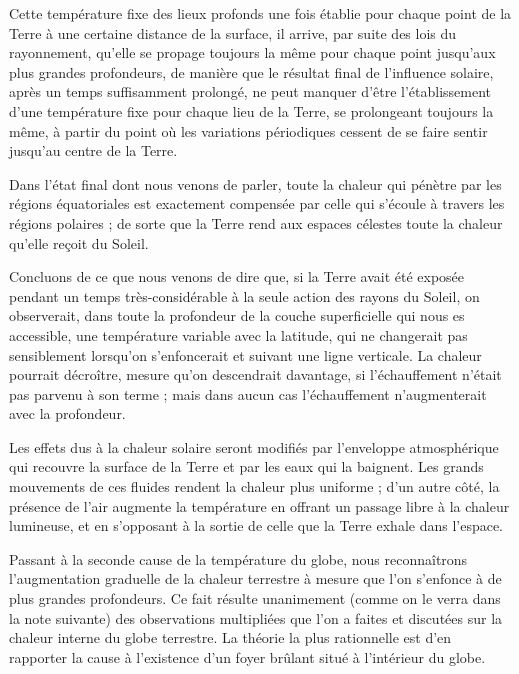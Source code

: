 \documentclass[a4paper, 11pt, oneside, landscape]{article}
\begin{document}
Cette température fixe des lieux profonds une fois établie pour chaque point de la Terre à une certaine distance de la surface, il arrive, par suite des lois du rayonnement, qu'elle se propage toujours la même pour chaque point jusqu'aux plus grandes profondeurs, de manière que le résultat final de l'influence solaire, après un temps suffisamment prolongé, ne peut manquer d'être l'établissement d'une température fixe pour chaque lieu de la Terre, se prolongeant toujours la même, à partir du point où les variations périodiques cessent de se faire sentir jusqu'au centre de la Terre.

Dans l'état final dont nous venons de parler, toute la chaleur qui pénètre par les régions équatoriales est exactement compensée par celle qui s'écoule à travers les régions polaires ; de sorte que la Terre rend aux espaces célestes toute la chaleur qu'elle reçoit du Soleil.

Concluons de ce que nous venons de dire que, si la Terre avait été exposée pendant un temps très-considérable à la seule action des rayons du Soleil, on observerait, dans toute la profondeur de la couche superficielle qui nous es accessible, une température variable avec la latitude, qui ne changerait pas sensiblement lorsqu'on s'enfoncerait et suivant une ligne verticale. La chaleur pourrait décroître, mesure qu'on descendrait davantage, si l'échauffement n'était pas parvenu à son terme ; mais dans aucun cas l'échauffement n'augmenterait avec la profondeur.

Les effets dus à la chaleur solaire seront modifiés par l'enveloppe atmosphérique qui recouvre la surface de la Terre et par les eaux qui la baignent. Les grands mouvements de ces fluides rendent la chaleur plus uniforme ; d'un autre côté, la présence de l'air augmente la température en offrant un passage libre à la chaleur lumineuse, et en s'opposant à la sortie de celle que la Terre exhale dans l'espace.

Passant à la seconde cause de la température du globe, nous reconnaîtrons l'augmentation graduelle de la chaleur terrestre à mesure que l'on s'enfonce à de plus grandes profondeurs. Ce fait résulte unanimement (comme on le verra dans la note suivante) des observations multipliées que l'on a faites et discutées sur la chaleur interne du globe terrestre. La théorie la plus rationnelle est d'en rapporter la cause à l'existence d'un foyer brûlant situé à l'intérieur du globe.
\end{document}
